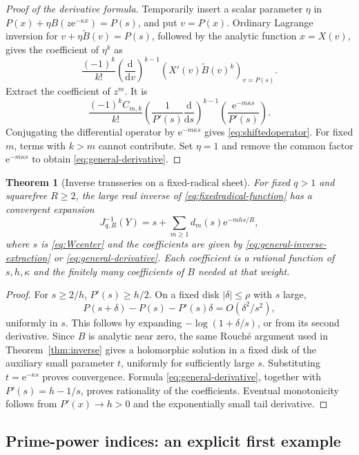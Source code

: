 \documentclass[11pt]{article}
\numberwithin{equation}{section}
\newtheorem{theorem}{Theorem}[section]
\theoremstyle{definition}
\newcommand{\ee}{\mathrm e}
\newcommand{\dd}{\mathrm d}
\begin{document}
\begin{proof}[Proof of the derivative formula]
Temporarily insert a scalar parameter $\eta$ in
$P(x)+\eta B(z\ee^{-\kappa x})=P(s)$, and put $v=P(x)$. Ordinary Lagrange inversion for
$v+\eta\widetilde B(v)=P(s)$, followed by the analytic function $x=X(v)$, gives the coefficient of $\eta^k$ as
\[
 \frac{(-1)^k}{k!}
 \left(\frac{\dd}{\dd v}\right)^{k-1}
 \left(X'(v)\widetilde B(v)^k\right)_{v=P(s)}.
\]
Extract the coefficient of $z^m$. It is
\[
 \frac{(-1)^k C_{m,k}}{k!}
 \left(\frac1{P'(s)}\frac{\dd}{\dd s}\right)^{k-1}
 \left(\frac{\ee^{-m\kappa s}}{P'(s)}\right).
\]
Conjugating the differential operator by $\ee^{-m\kappa s}$ gives \eqref{eq:shiftedoperator}. For fixed $m$, terms with $k>m$ cannot contribute. Set $\eta=1$ and remove the common factor $\ee^{-m\kappa s}$ to obtain \eqref{eq:general-derivative}.
\end{proof}

\begin{theorem}[Inverse transseries on a fixed-radical sheet]\label{thm:radical-inverse}
For fixed $q>1$ and squarefree $R\ge2$, the large real inverse of \eqref{eq:fixedradical-function} has a convergent expansion
\begin{equation}\label{eq:radical-inverse}
 J_{q,R}^{-1}(Y)=s+\sum_{m\ge1}d_m(s)\ee^{-mhs/R},
\end{equation}
where $s$ is \eqref{eq:Wcenter} and the coefficients are given by
\eqref{eq:general-inverse-extraction} or \eqref{eq:general-derivative}. Each coefficient is a rational function of $s,h,\kappa$ and the finitely many coefficients of $B$ needed at that weight.
\end{theorem}
\begin{proof}
For $s\ge2/h$, $P'(s)\ge h/2$. On a fixed disk $|\delta|\le\rho$ with $s$ large,
\[
 P(s+\delta)-P(s)-P'(s)\delta=O(\delta^2/s^2),
\]
uniformly in $s$. This follows by expanding $-\log(1+\delta/s)$, or from its second derivative. Since $B$ is analytic near zero, the same Rouch\'e argument used in Theorem~\ref{thm:inverse} gives a holomorphic solution in a fixed disk of the auxiliary small parameter $t$, uniformly for sufficiently large $s$. Substituting $t=\ee^{-\kappa s}$ proves convergence. Formula \eqref{eq:general-derivative}, together with $P'(s)=h-1/s$, proves rationality of the coefficients. Eventual monotonicity follows from $P'(x)\to h>0$ and the exponentially small tail derivative.
\end{proof}

\subsection{Prime-power indices: an explicit first example}
\end{document}
